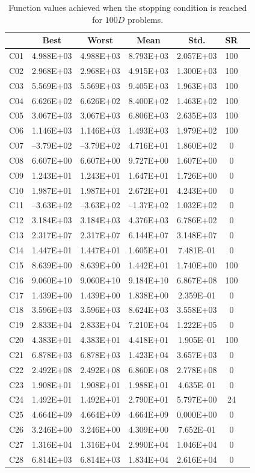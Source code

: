 \documentclass[conference]{IEEEtran}
\begin{document}
% 
% 
% 
\begin{table}[!ht]
	\caption{Function values achieved when the stopping condition is reached for $100D$ problems.}
	\centering
	\begin{tabular}{|c|c|c|c|c|c|c|}
	\hline
     & Best & Worst & Mean & Std. & SR \\ \hline \hline
C01 & 4.988E+03 & 4.988E+03 & 8.793E+03 & 2.057E+03 & 100 \\
C02 & 2.968E+03 & 2.968E+03 & 4.915E+03 & 1.300E+03 & 100 \\
C03 & 5.569E+03 & 5.569E+03 & 9.405E+03 & 1.963E+03 & 100 \\
C04 & 6.626E+02 & 6.626E+02 & 8.400E+02 & 1.463E+02 & 100 \\
C05 & 3.067E+03 & 3.067E+03 & 6.806E+03 & 2.635E+03 & 100 \\
C06 & 1.146E+03 & 1.146E+03 & 1.493E+03 & 1.979E+02 & 100 \\
C07 &--3.79E+02 &--3.79E+02 & 4.716E+01 & 1.860E+02 & 0 \\
C08 & 6.607E+00 & 6.607E+00 & 9.727E+00 & 1.607E+00 & 0 \\
C09 & 1.243E+01 & 1.243E+01 & 1.647E+01 & 1.726E+00 & 0 \\
C10 & 1.987E+01 & 1.987E+01 & 2.672E+01 & 4.243E+00 & 0 \\
C11 &--3.63E+02 &--3.63E+02 &--1.37E+02 & 1.032E+02 & 0 \\
C12 & 3.184E+03 & 3.184E+03 & 4.376E+03 & 6.786E+02 & 0 \\
C13 & 2.317E+07 & 2.317E+07 & 6.144E+07 & 3.148E+07 & 0 \\
C14 & 1.447E+01 & 1.447E+01 & 1.605E+01 & 7.481E--01 & 0 \\
C15 & 8.639E+00 & 8.639E+00 & 1.442E+01 & 1.740E+00 & 100 \\
C16 & 9.060E+10 & 9.060E+10 & 9.184E+10 & 6.867E+08 & 100 \\
C17 & 1.439E+00 & 1.439E+00 & 1.838E+00 & 2.359E--01 & 0 \\
C18 & 3.596E+03 & 3.596E+03 & 8.624E+03 & 3.558E+03 & 0 \\
C19 & 2.833E+04 & 2.833E+04 & 7.210E+04 & 1.222E+05 & 0 \\
C20 & 4.383E+01 & 4.383E+01 & 4.418E+01 & 1.905E--01 & 100 \\
C21 & 6.878E+03 & 6.878E+03 & 1.423E+04 & 3.657E+03 & 0 \\
C22 & 2.492E+08 & 2.492E+08 & 6.860E+08 & 2.778E+08 & 0 \\
C23 & 1.908E+01 & 1.908E+01 & 1.988E+01 & 4.635E--01 & 0 \\
C24 & 1.492E+01 & 1.492E+01 & 2.790E+01 & 5.797E+00 & 24 \\
C25 & 4.664E+09 & 4.664E+09 & 4.664E+09 & 0.000E+00 & 0 \\
C26 & 3.246E+00 & 3.246E+00 & 4.309E+00 & 7.652E--01 & 0 \\
C27 & 1.316E+04 & 1.316E+04 & 2.990E+04 & 1.046E+04 & 0 \\
C28 & 6.814E+03 & 6.814E+03 & 1.834E+04 & 2.616E+04 & 0 \\
\hline
	\end{tabular}
	\label{tab:d100}
\end{table}
\end{document}
